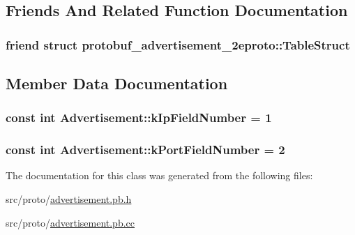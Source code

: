 \subsection{Friends And Related Function Documentation}
\subsubsection[{\texorpdfstring{protobuf\+\_\+advertisement\+\_\+2eproto\+::\+Table\+Struct}{protobuf_advertisement_2eproto::TableStruct}}]{\setlength{\rightskip}{0pt plus 5cm}friend struct {\bf protobuf\+\_\+advertisement\+\_\+2eproto\+::\+Table\+Struct}\hspace{0.3cm}{\ttfamily [friend]}}\hypertarget{class_advertisement_adca70d246273bf9389ffd0298f17348e}{}\label{class_advertisement_adca70d246273bf9389ffd0298f17348e}


\subsection{Member Data Documentation}
\subsubsection[{\texorpdfstring{k\+Ip\+Field\+Number}{kIpFieldNumber}}]{\setlength{\rightskip}{0pt plus 5cm}const int Advertisement\+::k\+Ip\+Field\+Number = 1\hspace{0.3cm}{\ttfamily [static]}}\hypertarget{class_advertisement_af81bcf66962615be07bc839412551a28}{}\label{class_advertisement_af81bcf66962615be07bc839412551a28}
\subsubsection[{\texorpdfstring{k\+Port\+Field\+Number}{kPortFieldNumber}}]{\setlength{\rightskip}{0pt plus 5cm}const int Advertisement\+::k\+Port\+Field\+Number = 2\hspace{0.3cm}{\ttfamily [static]}}\hypertarget{class_advertisement_abf0fccf8702c996ca959a0d6ddb6a009}{}\label{class_advertisement_abf0fccf8702c996ca959a0d6ddb6a009}


The documentation for this class was generated from the following files\+:\begin{DoxyCompactItemize}
\item 
src/proto/\hyperlink{advertisement_8pb_8h}{advertisement.\+pb.\+h}\item 
src/proto/\hyperlink{advertisement_8pb_8cc}{advertisement.\+pb.\+cc}\end{DoxyCompactItemize}

